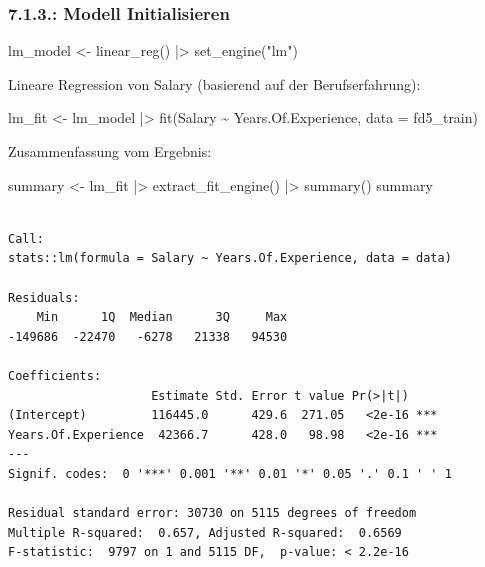 \documentclass[
  letterpaper,
  DIV=11,
  numbers=noendperiod]{scrartcl}
\newenvironment{Shaded}{\begin{snugshade}}{\end{snugshade}}
\newcommand{\AttributeTok}[1]{\textcolor[rgb]{0.40,0.45,0.13}{#1}}
\newcommand{\FunctionTok}[1]{\textcolor[rgb]{0.28,0.35,0.67}{#1}}
\newcommand{\NormalTok}[1]{\textcolor[rgb]{0.00,0.23,0.31}{#1}}
\newcommand{\OtherTok}[1]{\textcolor[rgb]{0.00,0.23,0.31}{#1}}
\newcommand{\SpecialCharTok}[1]{\textcolor[rgb]{0.37,0.37,0.37}{#1}}
\newcommand{\StringTok}[1]{\textcolor[rgb]{0.13,0.47,0.30}{#1}}
\begin{document}
\hypertarget{modell-initialisieren}{%
\subsubsection{7.1.3.: Modell
Initialisieren}\label{modell-initialisieren}}

\begin{Shaded}
\begin{Highlighting}[]
\NormalTok{lm\_model }\OtherTok{\textless{}{-}} \FunctionTok{linear\_reg}\NormalTok{() }\SpecialCharTok{|\textgreater{}} \FunctionTok{set\_engine}\NormalTok{(}\StringTok{"lm"}\NormalTok{)}
\end{Highlighting}
\end{Shaded}

Lineare Regression von Salary (basierend auf der Berufserfahrung):

\begin{Shaded}
\begin{Highlighting}[]
\NormalTok{lm\_fit }\OtherTok{\textless{}{-}}\NormalTok{ lm\_model }\SpecialCharTok{|\textgreater{}} \FunctionTok{fit}\NormalTok{(Salary }\SpecialCharTok{\textasciitilde{}}\NormalTok{ Years.Of.Experience, }\AttributeTok{data =}\NormalTok{ fd5\_train)}
\end{Highlighting}
\end{Shaded}

Zusammenfassung vom Ergebnis:

\begin{Shaded}
\begin{Highlighting}[]
\NormalTok{summary }\OtherTok{\textless{}{-}}\NormalTok{ lm\_fit }\SpecialCharTok{|\textgreater{}} \FunctionTok{extract\_fit\_engine}\NormalTok{() }\SpecialCharTok{|\textgreater{}} \FunctionTok{summary}\NormalTok{()}
\NormalTok{summary}
\end{Highlighting}
\end{Shaded}

\begin{verbatim}

Call:
stats::lm(formula = Salary ~ Years.Of.Experience, data = data)

Residuals:
    Min      1Q  Median      3Q     Max 
-149686  -22470   -6278   21338   94530 

Coefficients:
                    Estimate Std. Error t value Pr(>|t|)    
(Intercept)         116445.0      429.6  271.05   <2e-16 ***
Years.Of.Experience  42366.7      428.0   98.98   <2e-16 ***
---
Signif. codes:  0 '***' 0.001 '**' 0.01 '*' 0.05 '.' 0.1 ' ' 1

Residual standard error: 30730 on 5115 degrees of freedom
Multiple R-squared:  0.657, Adjusted R-squared:  0.6569 
F-statistic:  9797 on 1 and 5115 DF,  p-value: < 2.2e-16
\end{verbatim}
\end{document}
